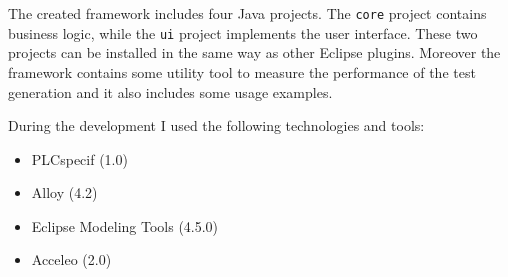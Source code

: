 The created framework includes four Java projects. The \texttt{core} project contains business logic, while the \texttt{ui} project implements the user interface. These two projects can be installed in the same way as other Eclipse plugins. Moreover the framework contains some utility tool to measure the performance of the test generation and it also includes some usage examples.

During the development I used the following technologies and tools:

\begin{itemize}[noitemsep,topsep=0pt,parsep=0pt,partopsep=0pt]
	\item PLCspecif (1.0)
	\item Alloy (4.2)
	\item Eclipse Modeling Tools (4.5.0)
	\item Acceleo (2.0)
\end{itemize}


